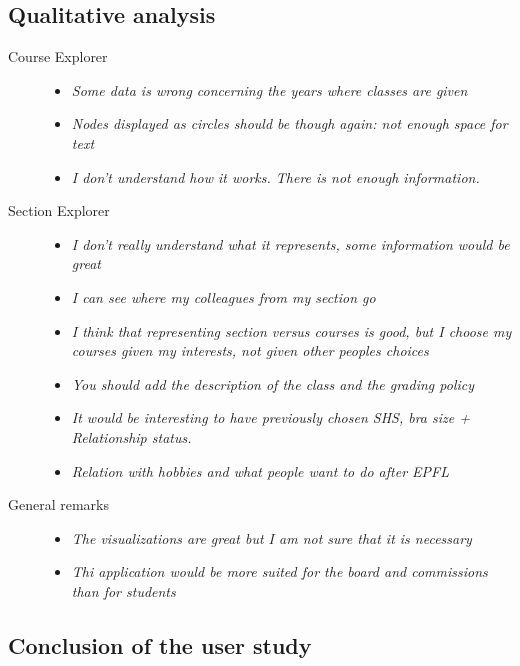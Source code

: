 \subsection{Qualitative analysis}

\begin{description}
\item[Course Explorer] \quad 
	\begin{itemize}
	\item \emph{Some data is wrong concerning the years where classes are given}
	\item \emph{Nodes displayed as circles should be though again: not enough space for text}
	\item \emph{I don't understand how it works. There is not enough information.}
	\end{itemize}
\item[Section Explorer] \quad 
	\begin{itemize}
	\item \emph{I don't really understand what it represents, some information would be great}
	\item \emph{I can see where my colleagues from my section go}
	\item \emph{I think that representing section versus courses is good, but I choose my courses given my interests, not given other peoples choices}
	\item \emph{You should add the description of the class and the grading policy}
	\item \emph{It would be interesting to have previously chosen SHS, bra size + Relationship status.}
	\item \emph{Relation with hobbies and what people want to do after EPFL}
	\end{itemize}
\item[General remarks] \quad
	\begin{itemize}
	\item \emph{The visualizations are great but I am not sure that it is necessary}
	\item \emph{Thi application would be more suited for the board and commissions than for students}
	\end{itemize}
\end{description}

\subsection{Conclusion of the user study}

